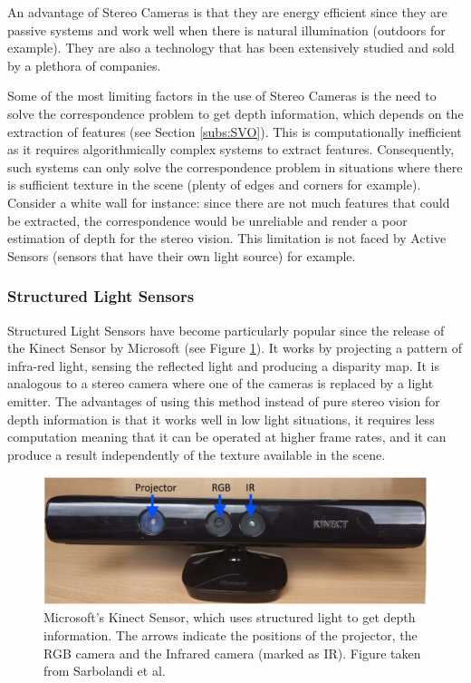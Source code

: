 \documentclass[11pt]{article}
\begin{document}
An advantage of Stereo Cameras is that they are energy efficient since they are passive systems and work well when there is natural illumination (outdoors for example). They are also a technology that has been extensively studied and sold by a plethora of companies.

Some of the most limiting factors in the use of Stereo Cameras is the need to solve the correspondence problem to get depth information, which depends on the extraction of features (see Section \ref{subs:SVO}). This is computationally inefficient as it requires algorithmically complex systems to extract features. Consequently, such systems can only solve the correspondence problem in situations where there is sufficient texture in the scene (plenty of edges and corners for example). Consider a white wall for instance: since there are not much features that could be extracted, the correspondence would be unreliable and render a poor estimation of depth for the stereo vision. This limitation is not faced by Active Sensors (sensors that have their own light source) for example.

	\subsubsection{Structured Light Sensors}

Structured Light Sensors have become particularly popular since the release of the Kinect Sensor by Microsoft \cite{kinectfusion} (see Figure \ref{fig:KinectSensor}). It works by projecting a pattern of infra-red light, sensing the reflected light and producing a disparity map. It is analogous to a stereo camera where one of the cameras is replaced by a light emitter. The advantages of using this method instead of pure stereo vision for depth information is that it works well in low light situations, it requires less computation meaning that it can be operated at higher frame rates, and it can produce a result independently of the texture available in the scene.

\begin{figure}
	\begin{minipage}{0.65\textwidth}
		\centering
		\includegraphics[width=\textwidth]{Kinectv1}
	\end{minipage} \hfill
	\begin{minipage}{0.35\textwidth}
		\centering
		\caption{Microsoft's Kinect Sensor, which uses structured light to get depth information. The arrows indicate the positions of the projector, the RGB camera and the Infrared camera (marked as IR). Figure taken from Sarbolandi et al. \cite{sarbolandi2015kinect}}
		\label{fig:KinectSensor}
	\end{minipage}				
\end{figure}
\end{document}
